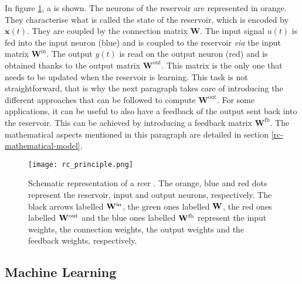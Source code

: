 In figure \ref{rc_principle}, a \rcer is shown. The neurons of the reservoir are represented in orange. They characterise what is called the state of the reservoir, which is encoded by $\mathbf{x}(t)$. They are coupled by the connection matrix $\mathbf{W}$. The input signal $u(t)$ is fed into the input neuron (blue) and is coupled to the reservoir \textit{via} the input matrix $\mathbf{W}^{\text{in}}$. The output $y(t)$ is read on the output neuron (red) and is obtained thanks to the output matrix $\mathbf{W}^{\text{out}}$. This matrix is the only one that needs to be updated when the reservoir is learning. This task is not straightforward, that is why the next paragraph takes care of introducing the different approaches that can be followed to compute $\mathbf{W}^{\text{out}}$. For some applications, it can be useful to also have a feedback of the output sent back into the reservoir. This can be achieved by introducing a feedback matrix $\mathbf{W}^{\text{fb}}$. The mathematical aspects mentioned in this paragraph are detailed in section \ref{rc-mathematical-model}.

\begin{figure}[h]
	\centering
	\texttt{[image: rc\_principle.png]}
	\caption{Schematic representation of a \acrlong{rcer} \cite{financialTimeSeries}. The orange, blue and red dots represent the reservoir, input and output neurons, respectively. The black arrows labelled $\mathbf{W}^{\text{in}}$, the green ones labelled $\mathbf{W}$, the red ones labelled $\mathbf{W}^{\text{out}}$ and the blue ones labelled $\mathbf{W}^{\text{fb}}$ represent the input weights, the connection weights, the output weights and the feedback weights, respectively.}
	\label{rc_principle}
\end{figure}


\subsection{Machine Learning}


